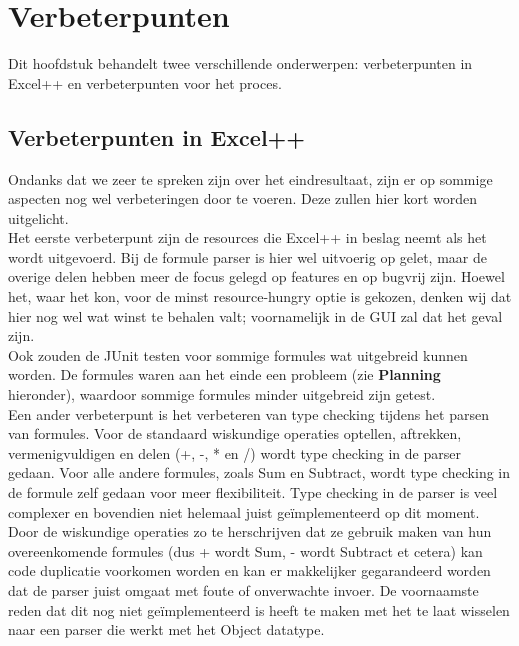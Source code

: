 \documentclass[a4paper,11pt,titlepage]{scrartcl}
\begin{document}
\newpage\section{Verbeterpunten}
Dit hoofdstuk behandelt twee verschillende onderwerpen: verbeterpunten in Excel++ en verbeterpunten voor het proces.\\

\subsection{Verbeterpunten in Excel++}
Ondanks dat we zeer te spreken zijn over het eindresultaat, zijn er op sommige aspecten nog wel verbeteringen door te voeren. Deze zullen hier kort worden uitgelicht.\\

Het eerste verbeterpunt zijn de resources die Excel++ in beslag neemt als het wordt uitgevoerd. Bij de formule parser is hier wel uitvoerig op gelet, maar de overige delen hebben meer de focus gelegd op features en op bugvrij zijn. Hoewel het, waar het kon, voor de minst resource-hungry optie is gekozen, denken wij dat hier nog wel wat winst te behalen valt; voornamelijk in de GUI zal dat het geval zijn.\\

Ook zouden de JUnit testen voor sommige formules wat uitgebreid kunnen worden. De formules waren aan het einde een probleem (zie \textbf{Planning} hieronder), waardoor sommige formules minder uitgebreid zijn getest.\\

Een ander verbeterpunt is het verbeteren van type checking tijdens het parsen van formules. Voor de standaard wiskundige operaties optellen, aftrekken, vermenigvuldigen en delen (+, -, * en /) wordt type checking in de parser gedaan. Voor alle andere formules, zoals Sum en Subtract, wordt type checking in de formule zelf gedaan voor meer flexibiliteit. Type checking in de parser is veel complexer en bovendien niet helemaal juist geïmplementeerd op dit moment. Door de wiskundige operaties zo te herschrijven dat ze gebruik maken van hun overeenkomende formules (dus + wordt Sum, - wordt Subtract et cetera) kan code duplicatie voorkomen worden en kan er makkelijker gegarandeerd worden dat de parser juist omgaat met foute of onverwachte invoer. De voornaamste reden dat dit nog niet geïmplementeerd is heeft te maken met het te laat wisselen naar een parser die werkt met het Object datatype.\\
\end{document}
